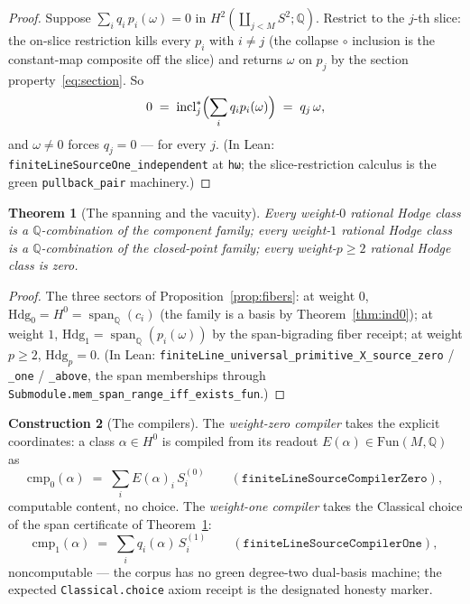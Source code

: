 \documentclass[11pt,a4paper]{article}
\theoremstyle{plain}
\newtheorem{theorem}{Theorem}[section]
\theoremstyle{definition}
\newtheorem{construction}[theorem]{Construction}
\newcommand{\Q}{\mathbb{Q}}
\newcommand{\Span}{\operatorname{span}}
\begin{document}
\begin{proof}
Suppose $\sum_i q_i\, p_i(\omega) = 0$ in
$H^2(\coprod_{j<M} S^2;\Q)$.  Restrict to the $j$-th slice: the
on-slice restriction kills every $p_i$ with $i \ne j$ (the collapse
$\circ$ inclusion is the constant-map composite off the slice) and
returns $\omega$ on $p_j$ by the section
property~\eqref{eq:section}.  So
\[
0 \;=\; \mathrm{incl}_j^* \Bigl( \sum_i q_i p_i(\omega) \Bigr) \;=\;
q_j\, \omega ,
\]
and $\omega \ne 0$ forces $q_j = 0$ --- for every $j$.  (In Lean:
\texttt{finiteLineSourceOne\_independent} at \texttt{hω};
the slice-restriction calculus is the green
\texttt{pullback\_pair} machinery.)
\end{proof}

\begin{theorem}[The spanning and the vacuity]
\label{thm:span}
Every weight-$0$ rational Hodge class is a $\Q$-combination of the
component family; every weight-$1$ rational Hodge class is a
$\Q$-combination of the closed-point family; every weight-$p \ge 2$
rational Hodge class is zero.
\end{theorem}

\begin{proof}
The three sectors of Proposition~\ref{prop:fibers}: at weight $0$,
$\mathrm{Hdg}_0 = H^0 = \Span_\Q(c_i)$ (the family is a basis by
Theorem~\ref{thm:ind0}); at weight $1$, $\mathrm{Hdg}_1 =
\Span_\Q(p_i(\omega))$ by the span-bigrading fiber receipt; at
weight $p \ge 2$, $\mathrm{Hdg}_p = 0$.  (In Lean:
\texttt{finiteLine\_universal\_primitive\_X\_source\_zero} /
\texttt{\_one} / \texttt{\_above}, the span memberships through
\texttt{Submodule.mem\_span\_range\_iff\_exists\_fun}.)
\end{proof}

\begin{construction}[The compilers]\label{con:compilers}
The \emph{weight-zero compiler} takes the explicit coordinates: a
class $\alpha \in H^0$ is compiled from its readout $E(\alpha) \in
\mathrm{Fun}(M,\Q)$ as
\[
\mathrm{cmp}_0(\alpha) \;=\; \sum_i E(\alpha)_i\, S^{(0)}_i
\qquad (\texttt{finiteLineSourceCompilerZero}),
\]
computable content, no choice.  The \emph{weight-one compiler} takes
the Classical choice of the span certificate of
Theorem~\ref{thm:span}:
\[
\mathrm{cmp}_1(\alpha) \;=\; \sum_i q_i(\alpha)\, S^{(1)}_i
\qquad (\texttt{finiteLineSourceCompilerOne}),
\]
noncomputable --- the corpus has no green degree-two dual-basis
machine; the expected \texttt{Classical.choice} axiom receipt is the
designated honesty marker.
\end{construction}
\end{document}
